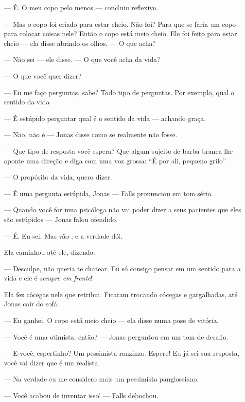 --- É. O meu copo pelo menos ---   concluiu\mudanca{,} reflexivo.

--- Mas o copo foi criado para estar cheio. Não foi? Para que se faria um copo para colocar coisas nele? Então o copo está meio cheio. Ele foi feito para estar cheio --- ela disse\mudanca{,} abrindo os olhos. --- O que acha?

--- Não sei --- ele disse. --- O que você acha da vida?

--- O que você quer dizer?

--- Eu me faço perguntas, sabe? Todo tipo de perguntas. Por exemplo, qual o sentido da vida

--- É estúpido perguntar qual é o sentido da vida ---  achando graça.

--- Não, não é --- Jonas disse\mudanca{,} como se realmente não fosse.

--- Que tipo de resposta você espera? Que algum sujeito de barba branca lhe aponte uma direção e diga com uma voz grossa: ``É por ali, pequeno grilo''

--- O propósito da vida, quero dizer.

--- É uma pergunta estúpida, Jonas --- Falls pronunciou em tom sério.

--- Quando você for uma psicóloga\mudanca{,} não vai poder dizer a seus pacientes que eles são estúpidos --- Jonas falou\mudanca{,} ofendido.

--- É. Eu sei. Mas vão , e a verdade dói.

Ela caminhou até ele, dizendo:

--- Desculpe, não queria te chatear. Eu só consigo pensar em um sentido para a vida\mudanca{,} e ele é \emph{sempre em frente}!

Ela fez cócegas nele\mudanca{,} que retribui. Ficaram trocando cócegas e gargalhadas, até Jonas cair do sofá.

--- Eu ganhei. O copo está meio cheio --- ela disse\mudanca{,} numa pose de vitória.

--- Você é uma otimista, então? --- Jonas perguntou em um tom de desafio.

--- E você, espertinho? Um pessimista ranzinza. Espere! Eu já sei sua resposta, você vai dizer que é um realista.

--- Na verdade\mudanca{,} eu me considero mais um pessimista panglossiano.

--- Você acabou de inventar isso! --- Falls debochou.

